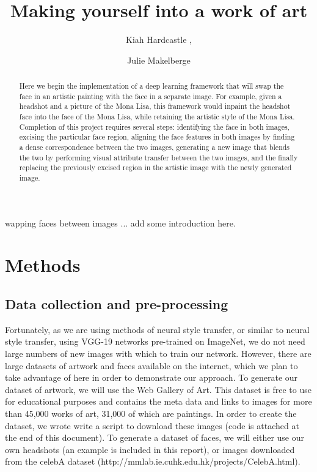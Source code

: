 \documentclass{pnastwo2}
\begin{document}
\title{Making yourself into a work of art}

\author{Kiah Hardcastle ,
\and Julie Makelberge}


\maketitle

\begin{article}

\begin{abstract}

Here we begin the implementation of a deep learning framework that will swap the face in an artistic painting with the face in a separate image. For example, given a headshot and a picture of the Mona Lisa, this framework would inpaint the headshot face into the face of the Mona Lisa, while retaining the artistic style of the Mona Lisa. Completion of this project requires several steps: identifying the face in both images, excising the particular face region, aligning the face features in both images by finding a dense correspondence between the two images, generating a new image that blends the two by performing visual attribute transfer between the two images, and the finally replacing the previously excised region in the artistic image with the newly generated image.

\end{abstract}

wapping faces between images ... add some introduction here.

\section{Methods}
\subsection{Data collection and pre-processing}

Fortunately, as we are using methods of neural style transfer, or similar to neural style transfer, using VGG-19 networks pre-trained on ImageNet, we do not need large numbers of new images with which to train our network. However, there are large datasets of artwork and faces available on the internet, which we plan to take advantage of here in order to demonstrate our approach. To generate our dataset of artwork, we will use the Web Gallery of Art. This dataset is free to use for educational purposes and contains the meta data and links to images for more than 45,000 works of art, 31,000 of which are paintings. In order to create the dataset, we wrote write a script to download these images (code is attached at the end of this document). To generate a dataset of faces, we will either use our own headshots (an example is included in this report), or images downloaded from the celebA dataset (http://mmlab.ie.cuhk.edu.hk/projects/CelebA.html). 


\end{article}
\end{document}
